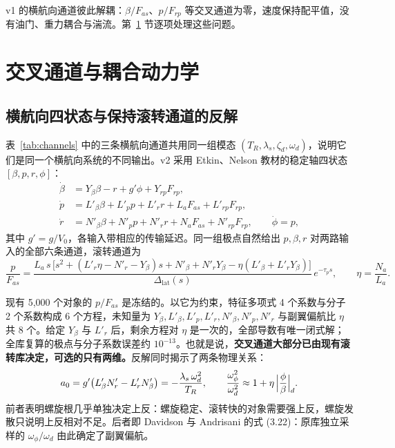 \documentclass[UTF8,a4paper,11pt,fontset=fandol,scheme=plain]{ctexart}
\begin{document}
v1 的横航向通道彼此解耦：\(\beta/F_{as}\)、\(p/F_{rp}\) 等交叉通道为零，速度保持配平值，没有油门、重力耦合与湍流。第~\ref{sec:v2} 节逐项处理这些问题。

\section{交叉通道与耦合动力学}
\label{sec:v2}
\subsection{横航向四状态与保持滚转通道的反解}
表~\ref{tab:channels} 中的三条横航向通道共用同一组模态 \((T_R,\lambda_s,\zeta_d,\omega_d)\)，说明它们是同一个横航向系统的不同输出。v2 采用 Etkin、Nelson 教材的稳定轴四状态 \([\beta,p,r,\phi]\)：
\begin{equation}
\begin{aligned}
\dot\beta&=Y_\beta\beta-r+g'\phi+Y_{rp}F_{rp},\\
\dot p&=L'_\beta\beta+L'_p p+L'_r r+L_aF_{as}+L'_{rp}F_{rp},\\
\dot r&=N'_\beta\beta+N'_p p+N'_r r+N_aF_{as}+N'_{rp}F_{rp},\qquad \dot\phi=p,
\end{aligned}
\end{equation}
其中 \(g'=g/V_0\)，各输入带相应的传输延迟。同一组极点自然给出 \(p,\beta,r\) 对两路输入的全部六条通道，滚转通道为
\begin{equation}
\frac{p}{F_{as}}=\frac{L_a\,s\,\bigl[s^2+(L'_r\eta-N'_r-Y_\beta)s+N'_\beta+N'_rY_\beta-\eta(L'_\beta+L'_rY_\beta)\bigr]}{\Delta_{\mathrm{lat}}(s)}\,e^{-\tau_p s},\qquad \eta=\frac{N_a}{L_a}.
\end{equation}

现有 5,000 个对象的 \(p/F_{as}\) 是冻结的。以它为约束，特征多项式 4 个系数与分子 2 个系数构成 6 个方程，未知量为 \(Y_\beta,L'_\beta,L'_p,L'_r,N'_\beta,N'_p,N'_r\) 与副翼偏航比 \(\eta\) 共 8 个。给定 \(Y_\beta\) 与 \(L'_r\) 后，剩余方程对 \(\eta\) 是一次的，全部导数有唯一闭式解；全库复算的极点与分子系数误差约 \(10^{-13}\)。也就是说，\textbf{交叉通道大部分已由现有滚转库决定，可选的只有两维。}反解同时揭示了两条物理关系：
\begin{equation}
a_0=g'\bigl(L'_\beta N'_r-L'_rN'_\beta\bigr)=-\frac{\lambda_s\,\omega_d^2}{T_R},\qquad \frac{\omega_\phi^2}{\omega_d^2}\approx 1+\eta\,\Bigl|\frac{\phi}{\beta}\Bigr|_d .
\end{equation}
前者表明螺旋根几乎单独决定上反：螺旋稳定、滚转快的对象需要强上反，螺旋发散只说明上反相对不足。后者即 Davidson 与 Andrisani 的式 (3.22)：原库独立采样的 \(\omega_\phi/\omega_d\) 由此确定了副翼偏航。
\end{document}
